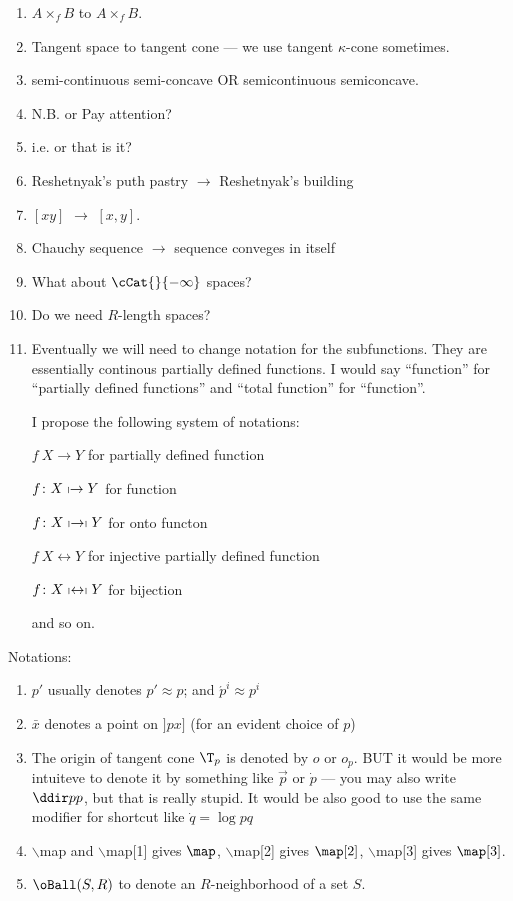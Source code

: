 \begin{enumerate}
\item $A\times_f B$ to $A\mathrel{{\times}_f} B$.

\item Tangent space to tangent cone --- we use tangent $\kappa$-cone sometimes.

\item semi-continuous semi-concave OR semicontinuous semiconcave.

\item N.B. or Pay attention?

\item i.e. or that is it?

\item Reshetnyak's puth pastry $\to$ Reshetnyak's building

\item $[xy]$ $\to$ $[x,y]$.

\item Chauchy sequence $\to$ sequence conveges in itself

\item What about $\cCat{}{-\infty}$ spaces?

\item Do we need $R$-length spaces?

\item Eventually we will need to change notation for the subfunctions.
They are essentially continous partially defined functions.
I would say ``function'' for ``partially defined functions''
and ``total function'' for ``function''.

I propose the following system of notations:

$f\:X\to Y$ for partially defined function

$f\:X\shortmid\to Y$ for function       

$f\:X\shortmid\to\shortmid Y$     for onto functon

$f\:X\leftrightarrow Y$      for injective partially defined function

$f\:X\shortmid\leftrightarrow\shortmid Y$     for bijection

and so on.

\end{enumerate}

Notations:
\begin{enumerate}
\item $p'$ usually denotes $p'\approx p$; 
and $\acute{p}^i\approx p^i$
\item $\bar x$ denotes a point on  $]p x]$ (for an evident choice of $p$)
\item The origin of tangent cone $\T_p$ is denoted by $o$ or $o_p$. BUT it would be more intuiteve to denote it by something like $\vec p$ or $\dot p$ --- you may also write $\ddir pp$, but that is really stupid.
It would be also good  to use the same modifier for shortcut like $\dot q=\log p q$
\item $\backslash$map and $\backslash$map[1] gives $\map$, $\backslash$map[2] gives $\map[2]$, $\backslash$map[3] gives $\map[3]$.
\item $\oBall(S,R)$  to denote an $R$-neighborhood of a set $S$.
\end{enumerate}

